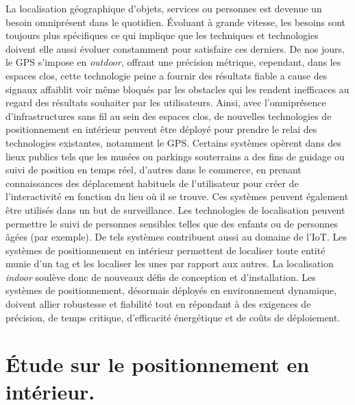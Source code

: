 \documentclass[12pt,a4paper]{report}
\begin{document}
La localisation géographique d'objets, services ou personnes est devenue un besoin omniprésent  dans le quotidien. Évoluant à grande vitesse, les besoins sont toujours plus spécifiques ce qui implique que les techniques et technologies doivent elle aussi évoluer constamment pour satisfaire ces derniers.
\newline
\newline
De nos jours, le GPS s’impose en \textit{outdoor}, offrant une précision métrique, cependant, dans les espaces clos, cette technologie peine a fournir des résultats fiable a cause des signaux affaiblit voir même bloqués par les obstacles qui les rendent inefficaces au regard des résultats souhaiter par les utilisateurs.
\newline
\newline
Ainsi, avec l’omniprésence d’infrastructures sans fil au sein des espaces clos, de nouvelles technologies de positionnement en intérieur peuvent être déployé pour prendre le relai des technologies existantes, notamment le GPS.
\newline
\newline
Certains systèmes opèrent dans des lieux publics tels que les musées ou parkings souterrains a des fins de guidage ou suivi de position en temps réel, d’autres dans le commerce, en prenant connaissances des déplacement habituels de l’utilisateur pour créer de l’interactivité en fonction du lieu où il se trouve.
\newline
\newline
Ces systèmes peuvent également être utilisés dans un but de surveillance. Les technologies de localisation peuvent permettre le suivi de personnes sensibles telles que des enfants ou de personnes âgées (par exemple).
\newline
\newline
De tels systèmes contribuent aussi au domaine de l’IoT. Les systèmes de positionnement en intérieur permettent de localiser toute entité munie d’un tag et les localiser les unes par rapport aux autres.
\newline
\newline
La localisation \textit{indoor} soulève donc de nouveaux défis de conception et d’installation. Les systèmes de positionnement, désormais déployés en environnement dynamique, doivent allier robustesse et fiabilité tout en répondant à des exigences de précision, de temps critique, d’efficacité énergétique et de coûts de déploiement.
\newpage
\chapter{Étude sur le positionnement en intérieur.}
\end{document}
